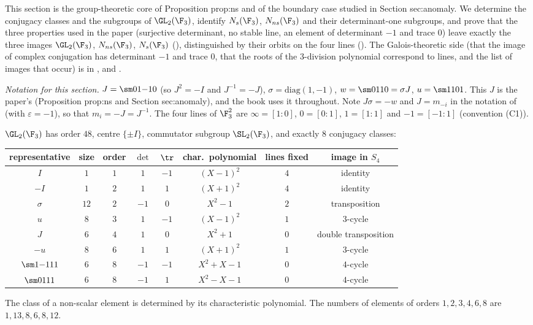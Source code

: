 This section is the group-theoretic core of Proposition prop:ns and of the boundary case studied in Section sec:anomaly. We determine the
conjugacy classes and the subgroups of $\GL_2(\F_3)$, identify $N_s(\F_3)$, $N_{ns}(\F_3)$ and their determinant-one subgroups, and prove that the
three properties used in the paper (surjective determinant, no stable line, an element of determinant $-1$ and trace $0$) leave exactly the
three images $\GL_2(\F_3)$, $N_{ns}(\F_3)$, $N_s(\F_3)$ (), distinguished by their orbits on the four lines
(). The Galois-theoretic side (that the image of complex conjugation has determinant $-1$ and trace $0$, that the
roots of the $3$-division polynomial correspond to lines, and the list of images that occur) is in ,  and
.

\emph{Notation for this section.} $J=\sm01{-1}0$ (so $J^2=-I$ and $J^{-1}=-J$), $\sigma=\mathrm{diag}(1,-1)$, $w=\sm0110=\sigma J$, $u=\sm1101$. This
$J$ is the paper's (Proposition prop:ns and Section sec:anomaly), and the book uses it throughout. Note $J\sigma=-w$ and $J=m_{-i}$ in the notation of
 (with $\varepsilon=-1$), so that $m_i=-J=J^{-1}$. The four lines of $\F_3^2$ are
$\infty=[1:0]$, $0=[0:1]$, $1=[1:1]$ and $-1=[-1:1]$ (convention (C1)).

\begin{proposition}\label{prop:groups:gl23classes}
$\GL_2(\F_3)$ has order $48$, centre $\{\pm I\}$, commutator subgroup $\SL_2(\F_3)$, and exactly $8$ conjugacy classes:
\begin{center}
\small
\begin{tabular}{cccccccc}
\toprule
representative & size & order & $\det$ & $\tr$ & char.\ polynomial & lines fixed & image in $S_4$\\
\midrule
$I$ & $1$ & $1$ & $1$ & $-1$ & $(X-1)^2$ & $4$ & identity\\
$-I$ & $1$ & $2$ & $1$ & $1$ & $(X+1)^2$ & $4$ & identity\\
$\sigma$ & $12$ & $2$ & $-1$ & $0$ & $X^2-1$ & $2$ & transposition\\
$u$ & $8$ & $3$ & $1$ & $-1$ & $(X-1)^2$ & $1$ & $3$-cycle\\
$J$ & $6$ & $4$ & $1$ & $0$ & $X^2+1$ & $0$ & double transposition\\
$-u$ & $8$ & $6$ & $1$ & $1$ & $(X+1)^2$ & $1$ & $3$-cycle\\
$\sm1{-1}11$ & $6$ & $8$ & $-1$ & $-1$ & $X^2+X-1$ & $0$ & $4$-cycle\\
$\sm0111$ & $6$ & $8$ & $-1$ & $1$ & $X^2-X-1$ & $0$ & $4$-cycle\\
\bottomrule
\end{tabular}
\end{center}
The class of a non-scalar element is determined by its characteristic polynomial. The numbers of elements of orders $1,2,3,4,6,8$ are
$1,13,8,6,8,12$.
\end{proposition}


